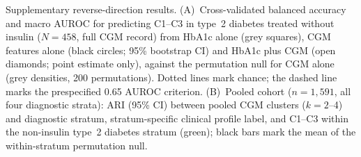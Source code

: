\caption{Supplementary reverse-direction results. (A)~Cross-validated balanced accuracy and macro AUROC for predicting C1--C3 in type~2 diabetes treated without insulin ($N=458$, full CGM record) from HbA1c alone (grey squares), CGM features alone (black circles; 95\% bootstrap CI) and HbA1c plus CGM (open diamonds; point estimate only), against the permutation null for CGM alone (grey densities, 200 permutations). Dotted lines mark chance; the dashed line marks the prespecified 0.65 AUROC criterion. (B)~Pooled cohort ($n=1{,}591$, all four diagnostic strata): ARI (95\% CI) between pooled CGM clusters ($k=2$--4) and diagnostic stratum, stratum-specific clinical profile label, and C1--C3 within the non-insulin type~2 diabetes stratum (green); black bars mark the mean of the within-stratum permutation null.}

